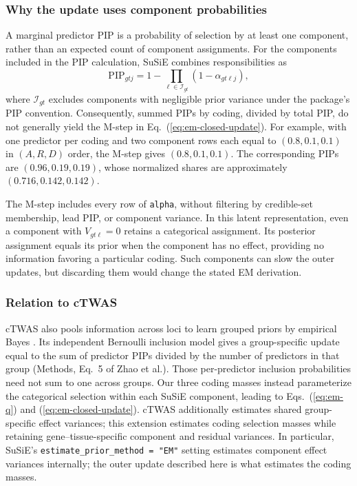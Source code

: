 \documentclass[12pt]{article}
\begin{document}
\subsubsection*{Why the update uses component probabilities}
A marginal predictor PIP is a probability of selection by at least one
component, rather than an expected count of component assignments. For
the components included in the PIP calculation, SuSiE combines
responsibilities as
\begin{equation}
 \mathrm{PIP}_{gtj}
 =1-\prod_{\ell\in\mathcal{I}_{gt}}
       (1-\alpha_{gt\ell j}),
 \label{eq:em-pip}
\end{equation}
where $\mathcal{I}_{gt}$ excludes components with negligible prior
variance under the package's PIP convention. Consequently, summed PIPs
by coding, divided by total PIP, do not generally yield the M-step in
Eq.~(\ref{eq:em-closed-update}). For example, with one predictor per
coding and two component rows each equal to $(0.8,0.1,0.1)$ in $(A,R,D)$
order, the M-step gives $(0.8,0.1,0.1)$. The corresponding PIPs are
$(0.96,0.19,0.19)$, whose normalized shares are approximately
$(0.716,0.142,0.142)$.

The M-step includes every row of \texttt{alpha}, without filtering by
credible-set membership, lead PIP, or component variance. In this latent
representation, even a component with $V_{gt\ell}=0$ retains a categorical
assignment. Its posterior assignment equals its prior when the component
has no effect, providing no information favoring a particular coding.
Such components can slow the outer updates, but discarding them would
change the stated EM derivation.

\subsubsection*{Relation to cTWAS}
cTWAS also pools information across loci to learn grouped priors by
empirical Bayes \cite{zhao_adjusting_2024}. Its independent Bernoulli
inclusion model gives a group-specific update equal to the sum of
predictor PIPs divided by the number of predictors in that group
(Methods, Eq.~5 of Zhao et al.). Those per-predictor inclusion
probabilities need not sum to one across groups. Our three coding masses
instead parameterize the categorical selection within each SuSiE
component, leading to Eqs.~(\ref{eq:em-q}) and
(\ref{eq:em-closed-update}). cTWAS additionally estimates shared
group-specific effect variances; this extension estimates coding
selection masses while retaining gene--tissue-specific component and
residual variances. In particular, SuSiE's
\texttt{estimate\_prior\_method = "EM"} setting estimates component
effect variances internally; the outer update described here is what
estimates the coding masses.
\end{document}
